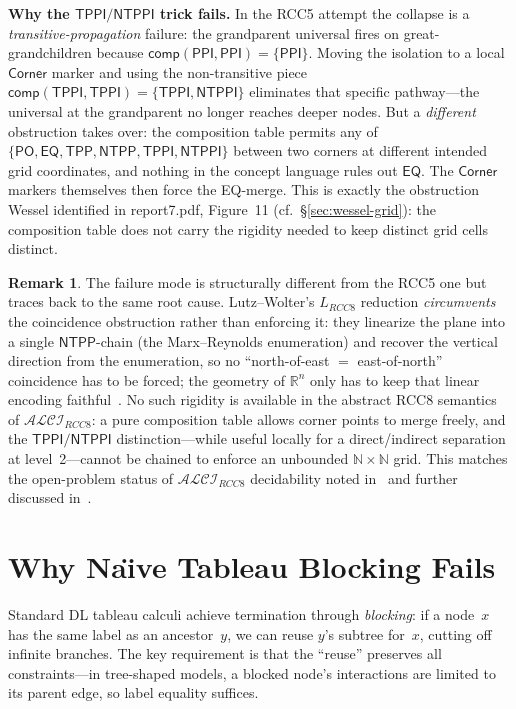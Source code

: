 \documentclass[
]{ceurart}
\theoremstyle{definition}
\newtheorem{remark}[theorem]{Remark}
\newcommand{\ALCIRCC}[1]{\ensuremath{\mathcal{ALCI}_{\mathit{RCC#1}}}}
\newcommand{\LRCC}[1]{\ensuremath{L_{\mathit{RCC#1}}}}
\newcommand{\PO}{\ensuremath{\mathsf{PO}}}
\newcommand{\EQ}{\ensuremath{\mathsf{EQ}}}
\newcommand{\PPI}{\ensuremath{\mathsf{PPI}}}
\newcommand{\TPP}{\ensuremath{\mathsf{TPP}}}
\newcommand{\NTPP}{\ensuremath{\mathsf{NTPP}}}
\newcommand{\TPPI}{\ensuremath{\mathsf{TPPI}}}
\newcommand{\NTPPI}{\ensuremath{\mathsf{NTPPI}}}
\newcommand{\comp}{\ensuremath{\mathsf{comp}}}
\newcommand{\naturals}{\mathbb{N}}
\newcommand{\reals}{\mathbb{R}}
\begin{document}
\medskip\noindent\textbf{Why the $\TPPI/\NTPPI$ trick fails.} In
the RCC5 attempt the collapse is a \emph{transitive-propagation}
failure: the grandparent universal fires on great-grandchildren
because $\comp(\PPI,\PPI) = \{\PPI\}$.  Moving the isolation to a
local $\textsf{Corner}$ marker and using the non-transitive piece
$\comp(\TPPI,\TPPI) = \{\TPPI, \NTPPI\}$ eliminates that specific
pathway---the universal at the grandparent no longer reaches
deeper nodes.  But a \emph{different} obstruction takes over: the
composition table permits any of
$\{\PO, \EQ, \TPP, \NTPP, \TPPI, \NTPPI\}$ between two corners at
different intended grid coordinates, and nothing in the concept
language rules out $\EQ$.  The $\textsf{Corner}$ markers themselves
then force the EQ-merge.  This is exactly the obstruction Wessel
identified in report7.pdf, Figure~11 (cf.~\S\ref{sec:wessel-grid}):
the composition table does not carry the rigidity needed to keep
distinct grid cells distinct.

\begin{remark}
The failure mode is structurally different from the RCC5 one but
traces back to the same root cause.  Lutz--Wolter's $\LRCC{8}$
reduction \emph{circumvents} the coincidence obstruction rather than
enforcing it: they linearize the plane into a single $\NTPP$-chain
(the Marx--Reynolds enumeration) and recover the vertical direction
from the enumeration, so no ``north-of-east $=$ east-of-north''
coincidence has to be forced; the geometry of $\reals^n$ only has to
keep that linear encoding faithful~\cite{LutzWolter2006}.  No such rigidity is available in
the abstract RCC8 semantics of $\ALCIRCC{8}$: a pure composition
table allows corner points to merge freely, and the $\TPPI/\NTPPI$
distinction---while useful locally for a direct/indirect
separation at level~2---cannot be chained to enforce an unbounded
$\naturals \times \naturals$ grid.  This matches the open-problem
status of $\ALCIRCC{8}$ decidability noted in~\cite{LutzWolter2006}
and further discussed in~\cite{Wessel2003}.
\end{remark}

\section{Why Na\"{\i}ve Tableau Blocking Fails}
\label{sec:naive-blocking}

Standard DL tableau calculi achieve termination through
\emph{blocking}: if a node~$x$ has the same label as an ancestor~$y$,
we can reuse $y$'s subtree for~$x$, cutting off infinite
branches.  The key requirement is that the ``reuse'' preserves
all constraints---in tree-shaped models, a blocked node's
interactions are limited to its parent edge, so label equality suffices.
\end{document}
